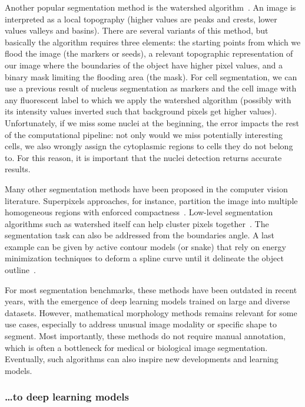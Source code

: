 Another popular segmentation method is the watershed algorithm~\cite{Vincent_1991}.
An image is interpreted as a local topography (higher values are peaks and crests, lower values valleys and basins).
There are several variants of this method, but basically the algorithm requires three elements: the starting points from which we flood the image (the markers or seeds), a relevant topographic representation of our image where the boundaries of the object have higher pixel values, and a binary mask limiting the flooding area (the mask).
For cell segmentation, we can use a previous result of nucleus segmentation as markers and the cell image with any fluorescent label to which we apply the watershed algorithm (possibly with its intensity values inverted such that background pixels get higher values).
Unfortunately, if we miss some nuclei at the beginning, the error impacts the rest of the computational pipeline: not only would we miss potentially interesting cells, we also wrongly assign the cytoplasmic regions to cells they do not belong to.
For this reason, it is important that the nuclei detection returns accurate results.

Many other segmentation methods have been proposed in the computer vision literature.
Superpixels approaches, for instance, partition the image into multiple homogeneous regions with enforced compactness~\cite{Ren_2003}.
Low-level segmentation algorithms such as watershed itself can help cluster pixels together~\cite{Machairas_2014}.
The segmentation task can also be addressed from the boundaries angle.
A last example can be given by active contour models (or snake) that rely on energy minimization techniques to deform a spline curve until it delineate the object outline~\cite{kass_snakes_1988}.

For most segmentation benchmarks, these methods have been outdated in recent years, with the emergence of deep learning models trained on large and diverse datasets.
However, mathematical morphology methods remains relevant for some use cases, especially to address unusual image modality or specific shape to segment.
Most importantly, these methods do not require manual annotation, which is often a bottleneck for medical or biological image segmentation.
Eventually, such algorithms can also inspire new developments and learning models.

\subsubsection{\dots to deep learning models}

